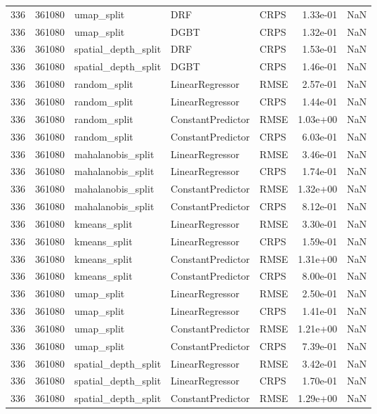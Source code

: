 \begin{tabular}{rrlllrr}
336 & 361080 & umap\_split & DRF & CRPS & 1.33e-01 & NaN \\
336 & 361080 & umap\_split & DGBT & CRPS & 1.32e-01 & NaN \\
336 & 361080 & spatial\_depth\_split & DRF & CRPS & 1.53e-01 & NaN \\
336 & 361080 & spatial\_depth\_split & DGBT & CRPS & 1.46e-01 & NaN \\
336 & 361080 & random\_split & LinearRegressor & RMSE & 2.57e-01 & NaN \\
336 & 361080 & random\_split & LinearRegressor & CRPS & 1.44e-01 & NaN \\
336 & 361080 & random\_split & ConstantPredictor & RMSE & 1.03e+00 & NaN \\
336 & 361080 & random\_split & ConstantPredictor & CRPS & 6.03e-01 & NaN \\
336 & 361080 & mahalanobis\_split & LinearRegressor & RMSE & 3.46e-01 & NaN \\
336 & 361080 & mahalanobis\_split & LinearRegressor & CRPS & 1.74e-01 & NaN \\
336 & 361080 & mahalanobis\_split & ConstantPredictor & RMSE & 1.32e+00 & NaN \\
336 & 361080 & mahalanobis\_split & ConstantPredictor & CRPS & 8.12e-01 & NaN \\
336 & 361080 & kmeans\_split & LinearRegressor & RMSE & 3.30e-01 & NaN \\
336 & 361080 & kmeans\_split & LinearRegressor & CRPS & 1.59e-01 & NaN \\
336 & 361080 & kmeans\_split & ConstantPredictor & RMSE & 1.31e+00 & NaN \\
336 & 361080 & kmeans\_split & ConstantPredictor & CRPS & 8.00e-01 & NaN \\
336 & 361080 & umap\_split & LinearRegressor & RMSE & 2.50e-01 & NaN \\
336 & 361080 & umap\_split & LinearRegressor & CRPS & 1.41e-01 & NaN \\
336 & 361080 & umap\_split & ConstantPredictor & RMSE & 1.21e+00 & NaN \\
336 & 361080 & umap\_split & ConstantPredictor & CRPS & 7.39e-01 & NaN \\
336 & 361080 & spatial\_depth\_split & LinearRegressor & RMSE & 3.42e-01 & NaN \\
336 & 361080 & spatial\_depth\_split & LinearRegressor & CRPS & 1.70e-01 & NaN \\
336 & 361080 & spatial\_depth\_split & ConstantPredictor & RMSE & 1.29e+00 & NaN \\

\end{tabular}

